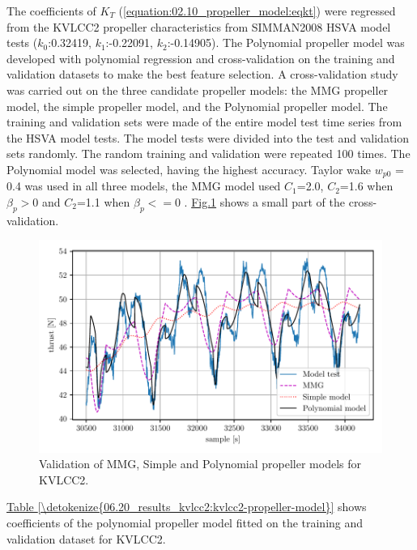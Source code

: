 The coefficients of \(K_T\) (\autoref{equation:02.10_propeller_model:eqkt}) were regressed from the KVLCC2 propeller characteristics from SIMMAN2008 HSVA model tests \cite{stern_experience_2011} (\(k_0\):{0.32419}, \(k_1\):{-0.22091}, \(k_2\):{-0.14905}).
The Polynomial propeller model was developed with polynomial regression and cross-validation on the training and validation datasets to make the best feature selection.
A cross-validation study was carried out on the three candidate propeller models: the MMG propeller model, the simple propeller model, and the Polynomial propeller model. The training and validation sets were made of the entire model test time series from the HSVA model tests.
The model tests were divided into the test and validation sets randomly. The random training and validation were repeated 100 times. The Polynomial model was selected, having the highest accuracy. Taylor wake \(w_{p0}\) = {0.4} was used in all three models, the MMG model used \(C_1\)={2.0}, \(C_2\)={1.6} when \(\beta_p>0\) and \(C_2\)={1.1} when \(\beta_p<=0\) \cite{yasukawa_introduction_2015-1}. \hyperref[\detokenize{06.20_results_kvlcc2:fig-propeller-validation}]{Fig.\@ \ref{\detokenize{06.20_results_kvlcc2:fig-propeller-validation}}} shows a small part of the cross-validation.

\begin{figure}[!htb]
\centering
\includegraphics{kappa/images/12.pdf}
\caption{Validation of MMG, Simple and Polynomial propeller models for KVLCC2.}\label{\detokenize{06.20_results_kvlcc2:fig-propeller-validation}}\end{figure}


\noindent \hyperref[\detokenize{06.20_results_kvlcc2:kvlcc2-propeller-model}]{Table \ref{\detokenize{06.20_results_kvlcc2:kvlcc2-propeller-model}}} shows coefficients of the polynomial propeller model fitted on the training and validation dataset for KVLCC2.


